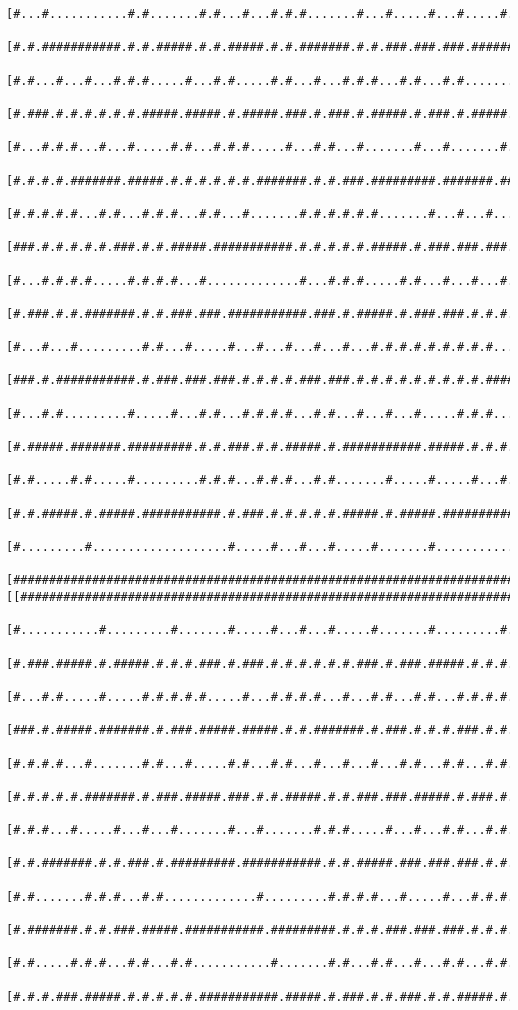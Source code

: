 \documentclass[a4paper,10pt,ngerman]{scrartcl}
\begin{document}
\begin{lstlisting}[frame=tb]
 [#...#...........#.#.......#.#...#...#.#.#.......#...#.....#...#.....#.#.#.#.....#]
 [#.#.###########.#.#.#####.#.#.#####.#.#.#######.#.#.###.###.###.#######.#.#######]
 [#.#...#...#...#.#.#.....#...#.#.....#.#...#...#.#.#...#.#...#.#.......#.#.#.....#]
 [#.###.#.#.#.#.#.#.#####.#####.#.#####.###.#.###.#.#####.#.###.#.#####.#.#.#.###.#]
 [#...#.#.#...#...#.....#.#...#.#.#.....#...#.#...#.......#...#.......#...#.#.#...#]
 [#.#.#.#.#######.#####.#.#.#.#.#.#.#######.#.#.###.#########.#######.#####.###.#.#]
 [#.#.#.#.#...#.#...#.#.#...#.#...#.......#.#.#.#.#.#.......#...#...#...#.#...#.#.#]
 [###.#.#.#.#.#.###.#.#.#####.###########.#.#.#.#.#.#####.#.###.###.###.#.###.#.###]
 [#...#.#.#.#.....#.#.#.#...#.............#...#.#.#.....#.#...#...#...#.#...#.#...#]
 [#.###.#.#.#######.#.#.###.###.###########.###.#.#####.#.###.###.#.#.#.###.#.###.#]
 [#...#...#.........#.#...#.....#...#...#...#...#...#.#.#.#.#.#.#.#.#...#...#.#...#]
 [###.#.###########.#.###.###.###.#.#.#.#.###.###.#.#.#.#.#.#.#.#.#.#####.###.#.#.#]
 [#...#.#.........#.....#...#.#...#.#.#.#...#.#...#...#...#.....#.#.#...#...#.#.#.#]
 [#.#####.#######.#########.#.#.###.#.#.#####.#.###########.#####.#.#.#.###.#.#.###]
 [#.#.....#.#.....#.........#.#.#...#.#.#...#.#.......#.....#.....#...#.....#.#...#]
 [#.#.#####.#.#####.###########.#.###.#.#.#.#.#.#####.#.#####.###############.###.#]
 [#.........#...................#.....#...#...#.....#.......#.....................#]
 [#################################################################################]]
[[#################################################################################]
 [#...........#.........#.......#.....#...#...#.....#.......#.........#.#.........#]
 [#.###.#####.#.#####.#.#.#.###.#.###.#.#.#.#.#.#.###.#.###.#####.#.#.#.#.###.#####]
 [#...#.#.....#.....#.#.#.#.#.....#...#.#.#.#...#...#.#...#.#...#.#.#.#.#.#.#.....#]
 [###.#.#####.#######.#.###.#####.#####.#.#.#######.#.###.#.#.#.###.#.#.#.#.#####.#]
 [#.#.#.#...#.......#.#...#.....#.#...#.#...#...#...#...#.#...#.#...#.#...#...#...#]
 [#.#.#.#.#.#######.#.###.#####.###.#.#.#####.#.#.###.###.#####.#.###.#.###.#.#.###]
 [#.#.#...#.....#...#...#.......#...#.......#.#.#.....#...#...#.#...#.#.#...#.#...#]
 [#.#.#######.#.#.###.#.#########.###########.#.#.#####.###.###.###.#.#.#.###.###.#]
 [#.#.......#.#.#...#.#.............#.........#.#.#.#...#.....#...#.#.#.#.#...#...#]
 [#.#######.#.#.###.#####.###########.#########.#.#.#.###.###.###.#.#.#.#.#.###.#.#]
 [#.#.....#.#.#...#.#...#.#...........#.......#.#...#.#...#...#.#...#.#.#.#.#...#.#]
 [#.#.#.###.#####.#.#.#.#.#.###########.#####.#.###.#.#.###.#.#.#####.#.#.###.###.#]

\end{lstlisting}
\end{document}

